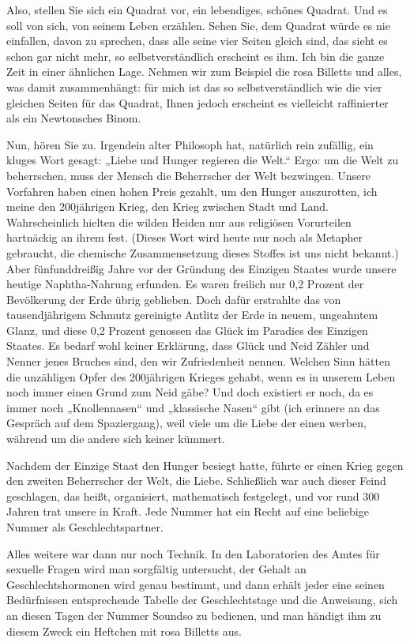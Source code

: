 Also, stellen Sie sich ein Quadrat vor, ein lebendiges, schönes
Quadrat. Und es soll von sich, von seinem Leben erzählen. Sehen
Sie, dem Quadrat würde es nie einfallen, davon zu sprechen, dass
alle seine vier Seiten gleich sind, das sieht es schon gar nicht
mehr, so selbstverständlich erscheint es ihm. Ich bin die ganze
Zeit in einer ähnlichen Lage. Nehmen wir zum Beispiel die rosa
Billetts und alles, was damit zusammenhängt: für mich ist das so
selbstverständlich wie die vier gleichen Seiten für das Quadrat,
Ihnen jedoch erscheint es vielleicht raffinierter als ein
Newtonsches Binom.

Nun, hören Sie zu. Irgendein alter Philosoph hat, natürlich rein
zufällig, ein kluges Wort gesagt: „Liebe und Hunger regieren die
Welt.“ Ergo: um die Welt zu beherrschen, muss der Mensch die
Beherrscher der Welt bezwingen.
Unsere Vorfahren haben einen hohen Preis gezahlt, um den
Hunger auszurotten, ich meine den 200jährigen Krieg, den Krieg
zwischen Stadt und Land. Wahrscheinlich hielten die wilden Heiden
nur aus religiösen Vorurteilen hartnäckig an ihrem  fest.
(Dieses Wort wird heute nur noch als Metapher gebraucht, die
chemische Zusammensetzung dieses Stoffes ist uns nicht bekannt.)
Aber fünfunddreißig Jahre vor der Gründung des Einzigen Staates
wurde unsere heutige Naphtha-Nahrung erfunden. Es waren freilich
nur 0,2 Prozent der Bevölkerung der Erde übrig geblieben. Doch
dafür erstrahlte das von tausendjährigem Schmutz gereinigte Antlitz
der Erde in neuem, ungeahntem Glanz, und diese 0,2 Prozent genossen
das Glück im Paradies des Einzigen Staates. Es bedarf wohl keiner
Erklärung, dass Glück und Neid Zähler und Nenner jenes Bruches
sind, den wir Zufriedenheit nennen. Welchen Sinn hätten die
unzähligen Opfer des 200jährigen Krieges gehabt, wenn es in unserem
Leben noch immer einen Grund zum Neid gäbe? Und doch existiert er
noch, da es immer noch „Knollennasen“ und „klassische Nasen“ gibt
(ich erinnere an das Gespräch auf dem Spaziergang), weil viele um
die Liebe der einen werben, während um die andere sich keiner
kümmert.

Nachdem der Einzige Staat den Hunger besiegt hatte, führte er einen
Krieg gegen den zweiten Beherrscher der Welt, die Liebe.
Schließlich war auch dieser Feind geschlagen, das heißt,
organisiert, mathematisch festgelegt, und vor rund 300 Jahren trat
unsere  in Kraft. Jede Nummer hat ein Recht auf eine
beliebige Nummer als Geschlechtspartner.

Alles weitere war dann nur noch Technik. In den Laboratorien des
Amtes für sexuelle Fragen wird man sorgfältig
untersucht, der Gehalt an Geschlechtshormonen wird genau bestimmt,
und dann erhält jeder eine seinen Bedürfnissen entsprechende
Tabelle der Geschlechtstage und die Anweisung, sich an diesen Tagen
der Nummer Soundso zu bedienen, und man händigt ihm zu diesem Zweck
ein Heftchen mit rosa Billetts aus.

